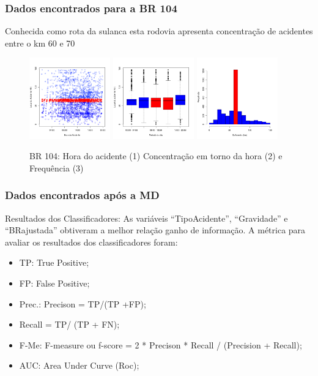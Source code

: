 \documentclass[11pt]{beamer}
\begin{document}
\begin{frame}\frametitle{Dados encontrados para a BR 104}
	Conhecida como rota da sulanca esta rodovia apresenta concentração de acidentes entre o km 60 e 70
	\pause
	\begin{figure}[h]
		\includegraphics[width=3.5cm,height=3.5cm]{Figuras/Preprocess/br104_12.png}
		\includegraphics[width=3.5cm,height=3.5cm]{Figuras/Preprocess/br104_2.png}
		\includegraphics[width=3.5cm,height=3.5cm]{Figuras/Preprocess/br104_3.png}
		\caption{BR 104: Hora do acidente (1) Concentração em torno da hora (2) e Frequência (3)}
	\end{figure}
\end{frame}
\begin{frame}\frametitle{Dados encontrados após a MD}
	Resultados dos Classificadores:
	As variáveis ``TipoAcidente'', ``Gravidade'' e ``BRajustada'' obtiveram a melhor relação ganho de informação.
	A métrica para avaliar os resultados dos classificadores foram:
	\pause
  \begin{itemize}
	\item TP: True Positive;
	\item FP: False Positive;
	\item Prec.: Precison = TP/(TP +FP);
	\item Recall = TP/ (TP + FN);
	\item F-Me: F-measure ou f-score = 2 * Precison * Recall / (Precision + Recall);
	\item AUC: Area Under Curve (Roc);
  \end{itemize}
\end{frame}
\end{document}

